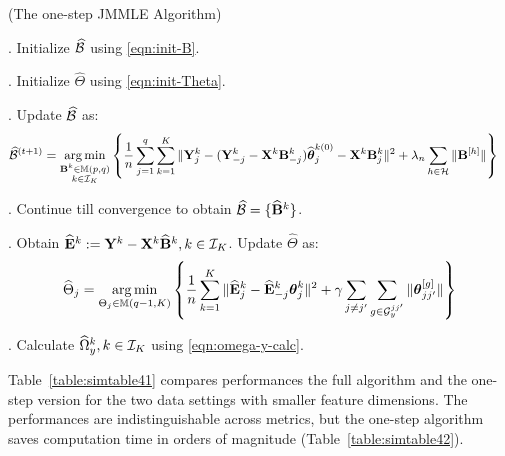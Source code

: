 \begin{Algorithm}
(The one-step JMMLE Algorithm)
\label{algo:jmmle-algo-1step}

. Initialize $\widehat {{\cal{B}}}$ using \eqref{eqn:init-B}.

. Initialize $\widehat \Theta$ using \eqref{eqn:init-Theta}.

. Update $\widehat {{\cal{B}}}$ as:
%
\begin{align*}
\widehat {{\cal{B}}}^{(t+1)} &= \operatorname*{arg\,min}_{\substack{{\mathbf{B}}^k \in {\mathbb{M}}(p,q)\\k \in {\cal{I}}_K}} \left\{ \frac{1}{n} \sum_{j=1}^q \sum_{k=1}^K \| {\mathbf{Y}}^k_j - ({\mathbf{Y}}_{-j}^k - {\mathbf{X}}^k {\mathbf{B}}_{-j}^k) \widehat {{\boldsymbol{\theta}}}_j^{k (0)} - {\mathbf{X}}^k {\mathbf{B}}_j^{k } \|^2
+ \lambda_n \sum_{h \in {\cal{H}}} \| {\mathbf{B}}^{[h]} \| \right\}
\end{align*}

. Continue till convergence to obtain $\widehat {{\cal{B}}} = \{ \widehat {{\mathbf{B}}}^k \}$.

. Obtain $\widehat {{\mathbf{E}}}^k := {\mathbf{Y}}^k - {\mathbf{X}}^k \widehat {{\mathbf{B}}}^k, k \in {\cal{I}}_K$. Update $\widehat \Theta$ as:
%
\begin{align*}
\widehat \Theta_j = \operatorname*{arg\,min}_{\Theta_j \in {\mathbb{M}}(q-1, K)}
\left\{ \frac{1}{n} \sum_{k=1}^K
\| \widehat {{\mathbf{E}}}_j^k - \widehat {{\mathbf{E}}}_{-j}^k {\boldsymbol{\theta}}_j^k \|^2
+ \gamma \sum_{j \neq j'} \sum_{g \in {\cal{G}}_y^{jj'}} \| {\boldsymbol{\theta}}_{jj'}^{[g]} \| \right\}
\end{align*}

. Calculate $\widehat \Omega_y^k, k \in {\cal{I}}_K$ using \eqref{eqn:omega-y-calc}.
\end{Algorithm}

Table~\ref{table:simtable41} compares performances the full algorithm and the one-step version for the two data settings with smaller feature dimensions. The performances are indistinguishable across metrics, but the one-step algorithm saves computation time in orders of magnitude (Table~\ref{table:simtable42}).

